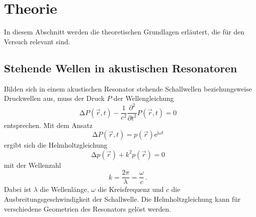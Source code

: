 \section{Theorie}
\label{sec:Theorie}
In diesem Abschnitt werden die theoretischen Grundlagen erläutert, die für den Versuch relevant sind.
%
%
%
%
%
\subsection{Stehende Wellen in akustischen Resonatoren}
Bilden sich in einem akustischen Resonator stehende Schallwellen beziehungsweise Druckwellen aus, muss der Druck $P$ der Wellengleichung
\begin{equation*}
    \increment P\left(\vec{r},t\right)  - \frac{1}{c^2} \frac{\partial^2}{\partial t^2} P\left(\vec{r},t\right) = 0 
\end{equation*}
entsprechen. Mit dem Ansatz
\begin{equation*}
    \increment P\left(\vec{r},t\right)  = p \left(\vec{r}\right) \mathrm{e}^{\mathrm{i} \omega t}
\end{equation*}
ergibt sich die Helmholtzgleichung \cite{colton_2013}
\begin{equation}
    \increment p\left(\vec{r}\right) + k^2 p\left(\vec{r}\right) = 0 
    \label{eqn:helmholtz}
\end{equation}
mit der Wellenzahl 
\begin{equation}
    k=\frac{2\pi}{\lambda}=\frac{\omega}{c} \, .
    \label{eqn:wellenzahl}
\end{equation}
Dabei ist $\lambda$ die Wellenlänge, $\omega$ die Kreisfrequenz und $c$ die Ausbreitungsgeschwindigkeit der Schallwelle.
Die Helmholtzgleichung kann für verschiedene Geometrien des Resonators gelöst werden.
%
%
%
%
